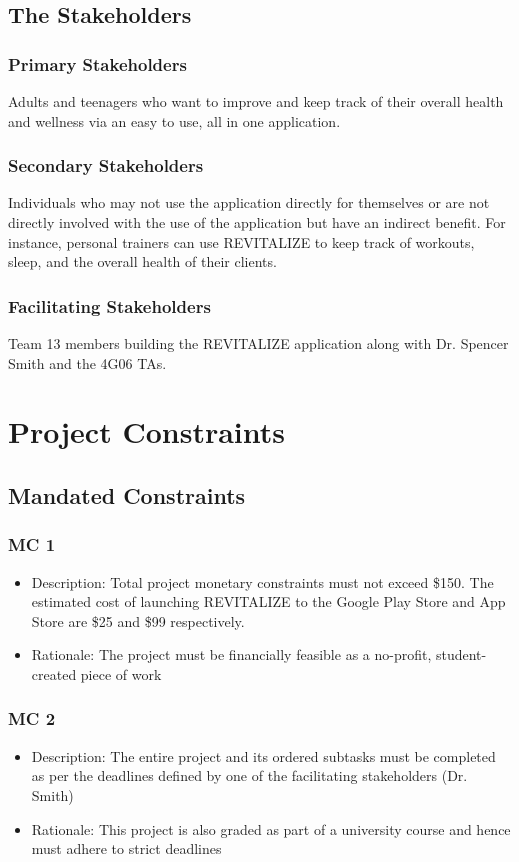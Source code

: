 \documentclass[12pt,letterpaper]{article}
\begin{document}
\subsection{The Stakeholders}

\subsubsection{Primary Stakeholders}
Adults and teenagers who want to improve and keep track of their overall health and wellness via an easy to use, all in one application.

\subsubsection{Secondary Stakeholders}
Individuals who may not use the application directly for themselves or are not directly involved with the use of the application but have an indirect benefit. For instance, personal trainers can use REVITALIZE to keep track of workouts, sleep, and the overall health of their clients.

\subsubsection{Facilitating Stakeholders}
Team 13 members building the REVITALIZE application along with Dr. Spencer Smith and the 4G06 TAs.

\section{Project Constraints}
\subsection{Mandated Constraints}
\subsubsection{MC 1}
\begin{itemize}
	\item Description: Total project monetary constraints must not exceed \$150. The estimated cost of launching REVITALIZE to the Google Play Store and App Store are \$25 and \$99 respectively.
	\item Rationale: The project must be financially feasible as a no-profit, student-created piece of work
\end{itemize}

\subsubsection{MC 2}
\begin{itemize}
	\item Description: The entire project and its ordered subtasks must be completed as per the deadlines defined by one of the facilitating stakeholders (Dr. Smith)
	\item Rationale: This project is also graded as part of a university course and hence must adhere to strict deadlines
\end{itemize}
\end{document}
